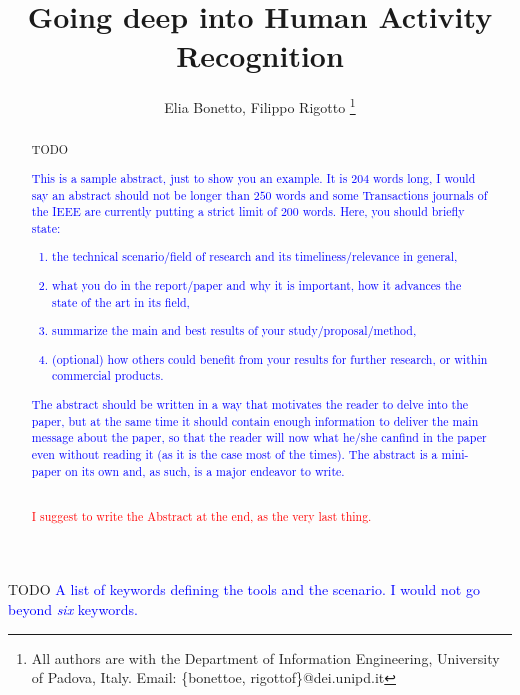 \documentclass[10pt, conference, letterpaper]{IEEEtran}
\title{Going deep into Human Activity Recognition}
\author{Elia Bonetto, Filippo Rigotto
\thanks{All authors are with the Department of Information Engineering, University of Padova, Italy. Email: \{bonettoe, rigottof\}@dei.unipd.it}}
\newcommand\MR[1]{\textcolor{blue}{#1}}
\newcommand\red[1]{\textcolor{red}{#1}}
\begin{document}
\maketitle

\begin{abstract}
TODO

\MR{This is a sample abstract, just to show you an example. It is $204$ words long, I would say an abstract should not be longer than $250$ words and some Transactions journals of the IEEE are currently putting a strict limit of $200$ words. Here, you should briefly state:
\begin{enumerate}
\item the technical scenario/field of research and its timeliness/relevance in general,
\item what you do in the report/paper and why it is important, how it advances the state of the art in its field,
\item summarize the main and best results of your study/proposal/method,
\item (optional) how others could benefit from your results for further research, or within commercial products.
\end{enumerate}
The abstract should be written in a way that motivates the reader to delve into the paper, but at the same time it should contain enough information to deliver the main message about the paper, so that the reader will now what he/she canfind in the paper even without reading it (as it is the case most of the times). The abstract is a mini-paper on its own and, as such, is a major endeavor to write.}\\

\red{I suggest to write the Abstract at the end, as the very last thing.}
\end{abstract}

\IEEEkeywords
TODO
\MR{A list of keywords defining the tools and the scenario. I would not go beyond {\it six} keywords.}
\endIEEEkeywords












\nocite{*} %


\end{document}
